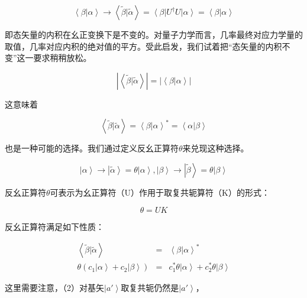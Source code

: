 \begin{equation}
\left\langle \beta | \alpha \right\rangle \to \left\langle \tilde{\beta} | \tilde{\alpha} \right\rangle = \left\langle \beta \right| U^\dagger U \left| \alpha \right\rangle = \left\langle \beta | \alpha \right\rangle 
\end{equation}

即态矢量的内积在幺正变换下是不变的。对量子力学而言，几率最终对应力学量的取值，几率对应内积的绝对值的平方。受此启发，我们试着把“态矢量的内积不变”这一要求稍稍放松。

\begin{equation}
\left|  \left\langle \tilde{\beta} | \tilde{\alpha} \right\rangle \right| = \left| \left\langle \beta | \alpha \right\rangle  \right|
\end{equation}

这意味着

\begin{equation}
\left\langle \tilde{\beta} | \tilde{\alpha} \right\rangle = \left\langle \beta | \alpha \right\rangle^* = \left\langle \alpha | \beta \right\rangle
\end{equation}

也是一种可能的选择。我们通过定义反幺正算符$\theta$来兑现这种选择。

\begin{equation}
\left| \alpha \right\rangle \to \left| \tilde{\alpha} \right\rangle = \theta \left| \alpha \right\rangle, \left| \beta \right\rangle \to \left| \tilde{\beta } \right\rangle = \theta \left| \beta \right\rangle
\end{equation}

反幺正算符$\theta$可表示为幺正算符（U）作用于取复共轭算符（K）的形式：

\begin{equation}
\theta = UK
\end{equation}

反幺正算符满足如下性质：

\begin{eqnarray}
\left\langle \tilde{\beta} | \tilde{\alpha} \right\rangle  &  =  &  \left\langle \beta | \alpha \right\rangle^*  \\
\theta \left( c_1 \left| \alpha \right\rangle + c_2 \left| \beta \right\rangle \right) & = & c_1^* \theta \left| \alpha \right\rangle + c_2^* \theta \left| \beta \right\rangle 
\end{eqnarray}

这里需要注意，（2）对基矢$\left| a' \right\rangle$取复共轭仍然是$\left| a' \right\rangle$，

